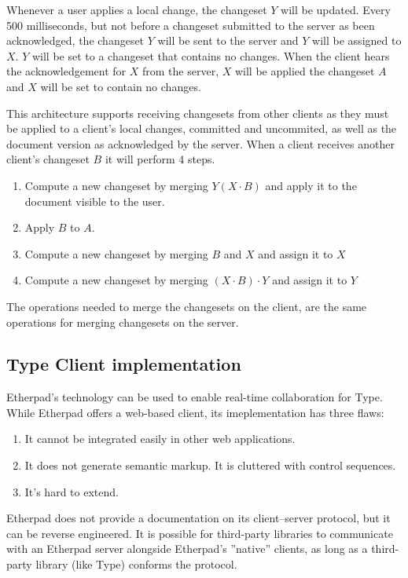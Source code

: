 Whenever a user applies a local change, the changeset $Y$ will be updated. Every 500 milliseconds, but not before a changeset submitted to the server as been acknowledged, the changeset $Y$ will be sent to the server and $Y$ will be assigned to $X$. $Y$ will be set to a changeset that contains no changes. When the client hears the acknowledgement for $X$ from the server, $X$ will be applied the changeset $A$ and $X$ will be set to contain no changes.

This architecture supports receiving changesets from other clients as they must be applied to a client's local changes, committed and uncommited, as well as the document version as acknowledged by the server. When a client receives another client's changeset $B$ it will perform 4 steps.

\begin{enumerate}
\item Compute a new changeset by merging $Y (X \cdot B)$ and apply it to the document visible to the user.
\item Apply $B$ to $A$.
\item Compute a new changeset by merging $B$ and $X$ and assign it to $X$
\item Compute a new changeset by merging $(X \cdot B) \cdot Y$ and assign it to $Y$
\end{enumerate}

The operations needed to merge the changesets on the client, are the same operations for merging changesets on the server.

\subsection{Type Client implementation}
\label{subsec:etherpad_type_client_implementation}

Etherpad's technology can be used to enable real-time collaboration for Type. While Etherpad offers a web-based client, its imeplementation has three flaws:

\begin{enumerate}
\item It cannot be integrated easily in other web applications.
\item It does not generate semantic markup. It is cluttered with control sequences.
\item It's hard to extend.
\end{enumerate}

Etherpad does not provide a documentation on its client--server protocol, but it can be reverse engineered. It is possible for third-party libraries to communicate with an Etherpad server alongside Etherpad's ''native'' clients, as long as a third-party library (like Type) conforms the protocol.

